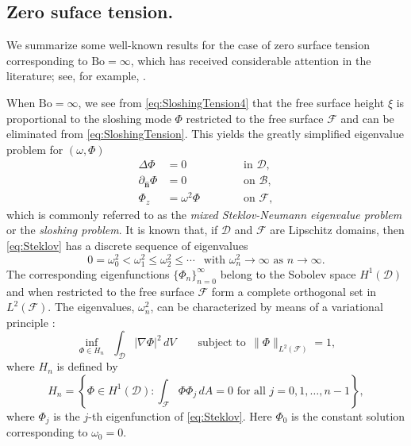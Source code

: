 \documentclass[letterpaper, 12pt]{amsart}
\newcommand{\bond}{\mathrm{Bo}}
\newcommand{\D}{\mathcal{D}}
\newcommand{\B}{\mathcal{B}}
\newcommand{\F}{\mathcal{F}}
\newcommand{\n}{\mathbf{\hat{n}}}
\begin{document}
\subsection{Zero suface tension.} \label{sec:ZeroSurfTen}
We summarize some well-known results for the case of zero surface tension corresponding to $\bond=\infty$, which has received considerable attention in the literature; see, for example,  \cite{Troesch:1960aa, Troesch:1965aa, Fox:1983aa, Kozlov:2004aa,  Ibrahim:2005aa,  Banuelos:2010aa, Kozlov:2011aa, Kulczycki:2014aa}. 

When $\bond = \infty$, we see from \eqref{eq:SloshingTension4} that the free surface height $\xi$ is proportional to the sloshing mode $\Phi$ restricted to the free surface $\F$ and can be eliminated from \eqref{eq:SloshingTension}. This yields the greatly simplified eigenvalue problem for $(\omega,\Phi)$
\begin{subequations}\label{eq:Steklov}
\begin{alignat}{2}
\Delta\Phi &=0 && \qquad\textrm{ in }\D, \\ 
\partial_\n\Phi &= 0 && \qquad\textrm{ on }\B, \\
\Phi_z & = \omega^2 \Phi && \qquad\textrm{ on }\F,  
\end{alignat}
\end{subequations}
which is commonly referred to as the \emph{mixed Steklov-Neumann eigenvalue problem} or the \emph{sloshing problem}. It is known \cite{Moiseev:1964aa, Kopachevsky:2012aa} that, if $\D$ and $\F$ are Lipschitz domains, then \eqref{eq:Steklov} has a discrete sequence of eigenvalues
\[ 0 = \omega_0^2 <\omega_1^2\le\omega_2^2\le\cdots \ \ \textrm{ with } \omega_n^2\longrightarrow\infty\textrm{ as }n\longrightarrow\infty. \]
The corresponding eigenfunctions $\{\Phi_n\}_{n=0}^\infty$ belong to the Sobolev space $H^1(\D)$ and when restricted to the free surface $\F$ form a complete orthogonal set in $L^2(\F)$. The eigenvalues, $\omega_n^2$, can be characterized by means of a variational principle \cite{Moiseev:1964aa,Troesch:1965aa}:
\begin{equation}\label{eq:SteklovVF}
\inf_{\Phi\in H_n} \ \   \int_\D |\nabla\Phi|^2\, dV  \qquad
\textrm{subject to} \ \  \|\Phi\|_{L^2(\F)} =1, 
\end{equation}
where $H_n$ is  defined by
$$ H_n = \left\{\Phi\in H^1(\D)\colon \int_\F\Phi\Phi_j\, dA = 0\textrm{ for all }j=0,1,\ldots,n-1\right\}, $$
where $\Phi_j$ is the $j$-th eigenfunction of \eqref{eq:Steklov}. 
Here $\Phi_0$ is the constant solution corresponding to $\omega_0=0$.
\end{document}

